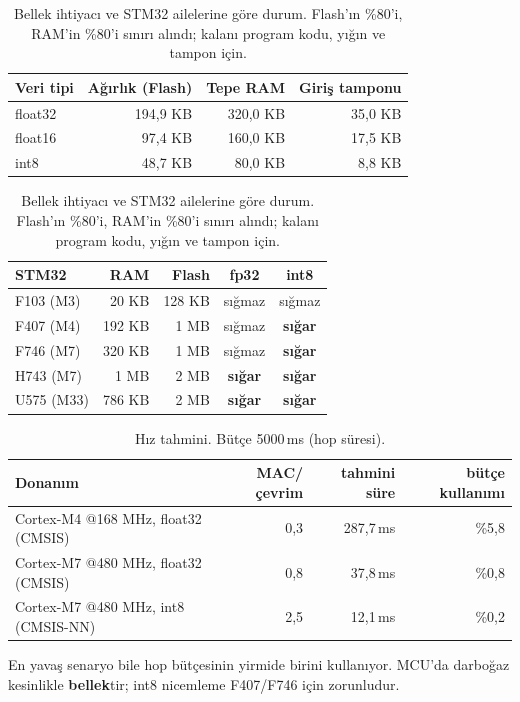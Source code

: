 \documentclass[11pt,a4paper]{report}
\newcommand{\ms}{\,ms}
\begin{document}
\begin{table}[H]
\centering\small
\begin{tabular}{@{}lrrr@{}}
\toprule
\textbf{Veri tipi} & \textbf{Ağırlık (Flash)} & \textbf{Tepe RAM} & \textbf{Giriş tamponu} \\
\midrule
float32 & 194{,}9 KB & 320{,}0 KB & 35{,}0 KB \\
float16 & 97{,}4 KB  & 160{,}0 KB & 17{,}5 KB \\
int8    & 48{,}7 KB  & 80{,}0 KB  & 8{,}8 KB \\
\bottomrule
\end{tabular}
\hspace{0.4cm}
\begin{tabular}{@{}lrrcc@{}}
\toprule
\textbf{STM32} & \textbf{RAM} & \textbf{Flash} & \textbf{fp32} & \textbf{int8} \\
\midrule
F103 (M3)  & 20 KB   & 128 KB  & sığmaz & sığmaz \\
F407 (M4)  & 192 KB  & 1 MB    & sığmaz & \textbf{sığar} \\
F746 (M7)  & 320 KB  & 1 MB    & sığmaz & \textbf{sığar} \\
H743 (M7)  & 1 MB    & 2 MB    & \textbf{sığar} & \textbf{sığar} \\
U575 (M33) & 786 KB  & 2 MB    & \textbf{sığar} & \textbf{sığar} \\
\bottomrule
\end{tabular}
\caption{Bellek ihtiyacı ve STM32 ailelerine göre durum. Flash'ın \%80'i,
RAM'in \%80'i sınırı alındı; kalanı program kodu, yığın ve tampon için.}
\end{table}

\begin{table}[H]
\centering\small
\begin{tabular}{@{}lrrr@{}}
\toprule
\textbf{Donanım} & \textbf{MAC/çevrim} & \textbf{tahmini süre} & \textbf{bütçe kullanımı} \\
\midrule
Cortex-M4 @168 MHz, float32 (CMSIS)   & 0{,}3 & 287{,}7\ms & \%5{,}8 \\
Cortex-M7 @480 MHz, float32 (CMSIS)   & 0{,}8 & 37{,}8\ms  & \%0{,}8 \\
Cortex-M7 @480 MHz, int8 (CMSIS-NN)   & 2{,}5 & 12{,}1\ms  & \%0{,}2 \\
\bottomrule
\end{tabular}
\caption{Hız tahmini. Bütçe 5000\ms{} (hop süresi).}
\end{table}

\begin{bulgu}
En yavaş senaryo bile hop bütçesinin yirmide birini kullanıyor. MCU'da darboğaz
kesinlikle \textbf{bellek}tir; int8 nicemleme F407/F746 için zorunludur.
\end{bulgu}
\end{document}
